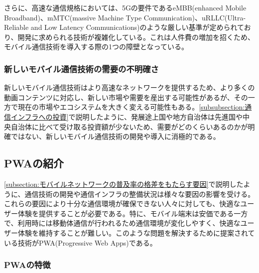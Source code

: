 さらに、高速な通信規格においては、5Gの要件であるeMBB(enhanced Mobile Broadband)、mMTC(massive Machine Type Communication)、uRLLC(Ultra-Reliable and Low Latency Communications)のような厳しい基準が定められており、開発に求められる技術が複雑化している。これは人件費の増加を招くため、モバイル通信技術を導入する際の1つの障壁となっている。
\subsubsection{新しいモバイル通信技術の需要の不明確さ}\label{subsubsection:新しいモバイル通信技術の需要の不明確さ}
新しいモバイル通信技術はより高速なネットワークを提供するため、より多くの動画コンテンツに対応し、新しい市場や需要を産出する可能性があるが、その一方で現在の市場やエコシステムを大きく変える可能性もある。\autoref{subsubsection:通信インフラへの投資}で説明したように、発展途上国や地方自治体は先進国や中央自治体に比べて受け取る投資額が少ないため、需要がどのくらいあるのかが明確ではない、新しいモバイル通信技術の開発や導入に消極的である。
\subsection{PWAの紹介}\label{subsection:PWAの紹介}
\autoref{subsection:モバイルネットワークの普及率の格差をもたらす要因}で説明したように、通信技術の開発や通信インフラの整備状況は様々な要因の影響を受ける。これらの要因により十分な通信環境が確保できない人々に対しても、快適なユーザー体験を提供することが必要である。特に、モバイル端末は安価である一方で、利用時には移動体通信が行われるため通信環境が変化しやすく、快適なユーザー体験を維持することが難しい。このような問題を解決するために提案されている技術がPWA(Progressive Web Apps)である。
\subsubsection{PWAの特徴}\label{subsubsection:PWAの特徴}
